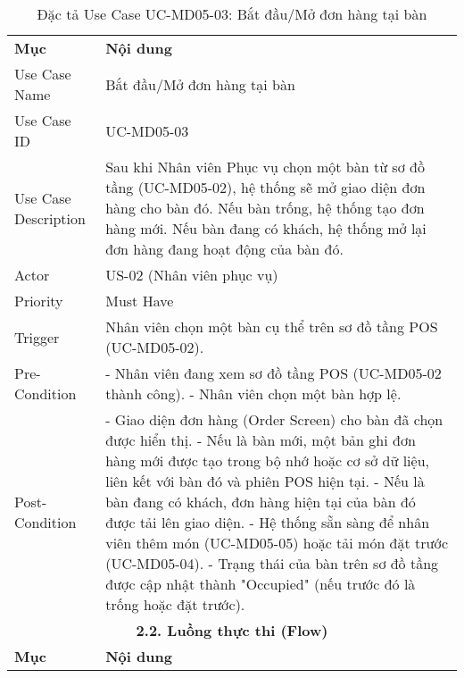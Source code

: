\begin{longtable}{|m{4cm}|p{11cm}|}
\caption{Đặc tả Use Case UC-MD05-03: Bắt đầu/Mở đơn hàng tại bàn} \label{tab:uc_md05_03} \\
\hline

\endhead %
\hline
\endfoot %
\hline
\endlastfoot %
\multicolumn{2}{|c|}{\textbf{2.1. Tóm tắt (Summary)}} \\
\hline
\textbf{Mục} & \textbf{Nội dung} \\
\hline
Use Case Name & Bắt đầu/Mở đơn hàng tại bàn \\
\hline
Use Case ID & UC-MD05-03 \\
\hline
Use Case Description & Sau khi Nhân viên Phục vụ chọn một bàn từ sơ đồ tầng (UC-MD05-02), hệ thống sẽ mở giao diện đơn hàng cho bàn đó. Nếu bàn trống, hệ thống tạo đơn hàng mới. Nếu bàn đang có khách, hệ thống mở lại đơn hàng đang hoạt động của bàn đó. \\
\hline
Actor & US-02 (Nhân viên phục vụ) \\
\hline
Priority & Must Have \\
\hline
Trigger & Nhân viên chọn một bàn cụ thể trên sơ đồ tầng POS (UC-MD05-02). \\
\hline
Pre-Condition & - Nhân viên đang xem sơ đồ tầng POS (UC-MD05-02 thành công). \newline - Nhân viên chọn một bàn hợp lệ. \\
\hline
Post-Condition & - Giao diện đơn hàng (Order Screen) cho bàn đã chọn được hiển thị. \newline - Nếu là bàn mới, một bản ghi đơn hàng mới được tạo trong bộ nhớ hoặc cơ sở dữ liệu, liên kết với bàn đó và phiên POS hiện tại. \newline - Nếu là bàn đang có khách, đơn hàng hiện tại của bàn đó được tải lên giao diện. \newline - Hệ thống sẵn sàng để nhân viên thêm món (UC-MD05-05) hoặc tải món đặt trước (UC-MD05-04). \newline - Trạng thái của bàn trên sơ đồ tầng được cập nhật thành "Occupied" (nếu trước đó là trống hoặc đặt trước). \\
\hline
\multicolumn{2}{|c|}{\textbf{2.2. Luồng thực thi (Flow)}} \\
\hline
\textbf{Mục} & \textbf{Nội dung} \\
\hline

\end{longtable}
